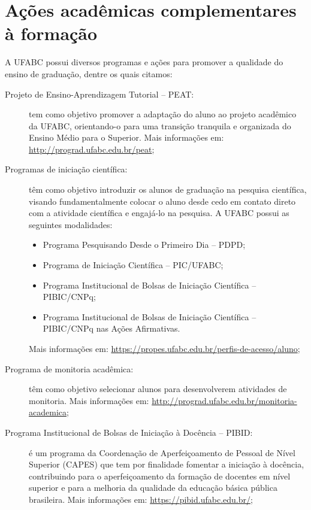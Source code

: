 \section{Ações acadêmicas complementares à formação}
\label{sec:acoes_complementares}

A UFABC possui diversos programas e ações para promover a qualidade do ensino
de graduação, dentre os quais citamos:
\begin{description}
    \item[Projeto de Ensino-Aprendizagem Tutorial -- PEAT:] tem como objetivo
    promover a adaptação do aluno ao projeto acadêmico da UFABC, orientando-o
    para uma transição tranquila e organizada do Ensino Médio para o Superior.
    Mais informações em: \url{http://prograd.ufabc.edu.br/peat};

    \item[Programas de iniciação científica:] têm como objetivo introduzir os
    alunos de graduação na pesquisa científica, visando fundamentalmente
    colocar o aluno desde cedo em contato direto com a atividade científica e
    engajá-lo na pesquisa. A UFABC possui as seguintes modalidades:
    \begin{itemize}
        \item Programa Pesquisando Desde o Primeiro Dia -- PDPD;
        \item Programa de Iniciação Científica -- PIC/UFABC;
        \item Programa Institucional de Bolsas de Iniciação Científica -- PIBIC/CNPq;
        \item Programa Institucional de Bolsas de Iniciação Científica -- PIBIC/CNPq nas Ações Afirmativas.
    \end{itemize}
    Mais informações em:
    \url{https://propes.ufabc.edu.br/perfis-de-acesso/aluno};

    \item[Programa de monitoria acadêmica:] têm como objetivo selecionar alunos
    para desenvolverem atividades de monitoria.
    Mais informações em:
    \url{http://prograd.ufabc.edu.br/monitoria-academica};

    \item[Programa Institucional de Bolsas de Iniciação à Docência -- PIBID:] é
    um programa da Coordenação de Aperfeiçoamento de Pessoal de Nível Superior
    (CAPES) que tem por finalidade fomentar a iniciação à docência,
    contribuindo para o aperfeiçoamento da formação de docentes em nível
    superior e para a melhoria da qualidade da educação básica pública
    brasileira.
    Mais informações em: \url{https://pibid.ufabc.edu.br/};


\end{description}
